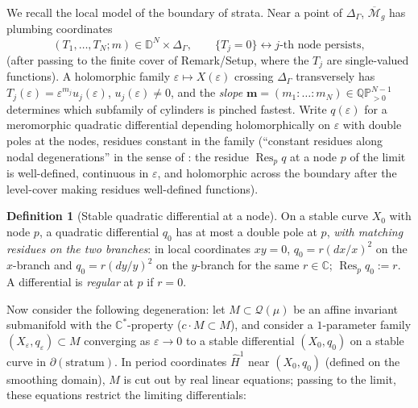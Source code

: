 \documentclass[11pt]{article}
\newcommand{\C}{\mathbb{C}}
\newcommand{\D}{\mathbb{D}}
\newcommand{\cQ}{\mathcal{Q}}
\newcommand{\M}{\mathcal{M}}
\DeclareMathOperator{\Res}{Res}
\theoremstyle{definition}
\newtheorem{defn}[thm]{Definition}
\theoremstyle{remark}
\begin{document}
We recall the local model of the boundary of strata. Near a point of
$\Delta_\Gamma$, $\overline{\M}_{g}$ has plumbing coordinates
\[
(T_1,\dots,T_N; m) \in \D^N \times \Delta_\Gamma, \qquad
\{T_j = 0\} \leftrightarrow \text{$j$-th node persists},
\]
(after passing to the finite cover of Remark/Setup, where the $T_j$ are
single-valued functions). A holomorphic family
$\varepsilon \mapsto X(\varepsilon)$ crossing $\Delta_\Gamma$ transversely
has $T_j(\varepsilon) = \varepsilon^{m_j} u_j(\varepsilon)$,
$u_j(\varepsilon) \neq 0$, and the \emph{slope}
$\mathbf{m} = (m_1 : \dots : m_N) \in \mathbb{QP}^{N-1}_{>0}$ determines
which subfamily of cylinders is pinched fastest. Write
$q(\varepsilon)$ for a meromorphic quadratic differential depending
holomorphically on $\varepsilon$ with double poles at the nodes, residues
constant in the family (``constant residues along nodal degenerations'' in
the sense of \cite{MW}: the residue $\Res_p q$ at a node $p$ of the limit
is well-defined, continuous in $\varepsilon$, and holomorphic across the
boundary after the level-cover making residues well-defined functions).

\begin{defn}[Stable quadratic differential at a node]
On a stable curve $X_0$ with node $p$, a quadratic differential $q_0$ has at
most a double pole at $p$, \emph{with matching residues on the two
branches}: in local coordinates $xy = 0$, $q_0 = r (dx/x)^2$ on the
$x$-branch and $q_0 = r(dy/y)^2$ on the $y$-branch for the same
$r \in \C$; $\Res_p q_0 := r$. A differential is \emph{regular} at $p$ if
$r = 0$.
\end{defn}

Now consider the following degeneration: let $M \subset \cQ(\mu)$ be an
affine invariant submanifold with the $\C^*$-property
($c \cdot M \subset M$), and consider a $1$-parameter family
$(X_\varepsilon, q_\varepsilon) \subset M$ converging as
$\varepsilon \to 0$ to a stable differential $(X_0, q_0)$ on a stable curve
in $\partial (\text{stratum})$. In period coordinates $\widehat H^1$
near $(X_0,q_0)$ (defined on the smoothing domain), $M$ is cut out by real
linear equations; passing to the limit, these equations restrict the
limiting differentials:
\end{document}
